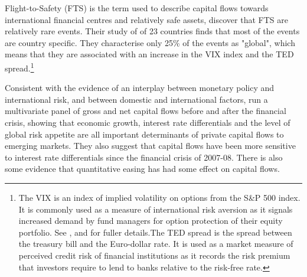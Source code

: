 \documentclass[12pt, a4paper, oneside]{article}\usepackage[]{graphicx}\usepackage[]{color}
\begin{document}
Flight-to-Safety (FTS) is the term used to describe capital flows towards international financial centres and relatively safe assets, \citet{FTS} discover that FTS are relatively rare events. Their study of of 23 countries finds that most of the events are country specific. They characterise only 25\% of the events as "global", which means that they are associated with an increase in the VIX index and the TED spread.\footnote{The VIX is an index of implied volatility on options from the S\&P 500 index.  It is commonly used as a measure of international risk aversion as it signals increased demand by fund managers for option protection of their equity portfolio.  See \citet{VIX}, \citet{GoldmanVol} and \citet{Diamond} for fuller details.The TED spread is the spread between the treasury bill and the Euro-dollar rate.  It is used as a market measure of perceived credit risk of financial institutions as it records the risk premium that investors require to lend to banks relative to the risk-free rate.}   %


Consistent with the evidence of an interplay between monetary policy and international risk, and between domestic and international factors, \citet{Ahmed2014} run a multivariate panel of gross and net capital flows before and after the financial crisis, showing that economic growth, interest rate differentials and the level of global risk appetite are all important determinants of private capital flows to emerging markets.  They also suggest that capital flows have been more sensitive to interest rate differentials since the financial crisis of 2007-08. There is also some evidence that quantitative easing has had some effect on capital flows. 
\end{document}
